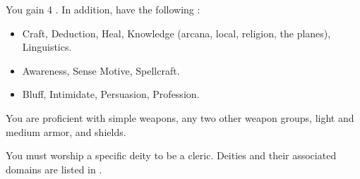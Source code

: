         You gain 4 .
        In addition, have the following :
        \begin{itemize}
            \item {} Craft, Deduction, Heal, Knowledge (arcana, local, religion, the planes), Linguistics.
            \item {} Awareness, Sense Motive, Spellcraft.
            \item {} Bluff, Intimidate, Persuasion, Profession.
        \end{itemize}

        You are proficient with simple weapons, any two other weapon groups, light and medium armor, and shields.

        You must worship a specific deity to be a cleric.
        Deities and their associated domains are listed in .

